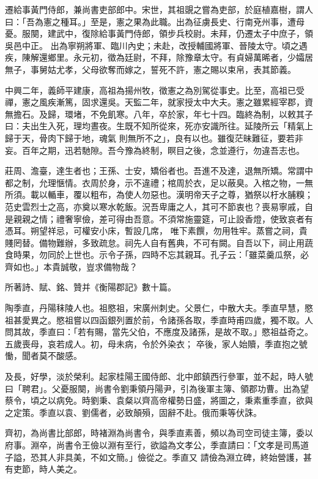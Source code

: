 \begin{pinyinscope}
 遷給事黃門侍郎，兼尚書吏部郎中。宋世，其祖覬之嘗為吏部，於庭植嘉樹，謂人曰：「吾為憲之種耳。」至是，憲之果為此職。出為征虜長史、行南兗州事，遭母憂。服闋，建武中，復除給事黃門侍郎，領步兵校尉。未拜，仍遷太子中庶子，領吳邑中正。
 出為寧朔將軍、臨川內史；未赴，改授輔國將軍、晉陵太守。頃之遇疾，陳解還鄉里。永元初，徵為廷尉，不拜，除豫章太守。有貞婦萬晞者，少孀居無子，事舅姑尤孝，父母欲奪而嫁之，誓死不許，憲之賜以束帛，表其節義。



 中興二年，義師平建康，高祖為揚州牧，徵憲之為別駕從事史。比至，高祖已受禪，憲之風疾漸篤，固求還吳。天監二年，就家授太中大夫。憲之雖累經宰郡，資無擔石。及歸，環堵，不免飢寒。八年，卒於家，年七十四。臨終為制，以敕其子曰：夫出生入死，理均晝夜。生既不知所從來，死亦安識所往。延陵所云「精氣上歸于天，骨肉下歸于地，魂氣
 則無所不之」，良有以也。雖復茫昧難征，要若非妄。百年之期，迅若馳隙。吾今豫為終制，瞑目之後，念並遵行，勿違吾志也。



 莊周、澹臺，達生者也；王孫、士安，矯俗者也。吾進不及達，退無所矯。常謂中都之制，允理愜情。衣周於身，示不違禮；棺周於衣，足以蔽臭。入棺之物，一無所須。載以輴車，覆以粗布，為使人勿惡也。漢明帝天子之尊，猶祭以杅水脯糗；范史雲烈士之高，亦奠以寒水乾飯。況吾卑庸之人，其可不節衷也？喪易寧戚，自是親親之情；禮奢寧儉，差可得由吾意。不須常施靈筵，可止設香燈，使致哀者有憑耳。朔望祥忌，可權安小床，暫設几席，
 唯下素饌，勿用牲牢。蒸嘗之祠，貴賤罔替。備物難辦，多致疏怠。祠先人自有舊典，不可有闕。自吾以下，祠止用蔬食時果，勿同於上世也。示令子孫，四時不忘其親耳。孔子云：「雖菜羹瓜祭，必齊如也。」本貴誠敬，豈求備物哉？



 所著詩、賦、銘、贊并《衡陽郡記》數十篇。



 陶季直，丹陽秣陵人也。祖愍祖，宋廣州刺史。父景仁，中散大夫。季直早慧，愍祖甚愛異之。愍祖嘗以四函銀列置於前，令諸孫各取，季直時甫四歲，獨不取。人問其故，季直曰：「若有賜，當先父伯，不應度及諸孫，是故不取。」愍祖益奇之。五歲喪母，哀若成人。初，母未病，令於外染衣；
 卒後，家人始贖，季直抱之號慟，聞者莫不酸感。



 及長，好學，淡於榮利。起家桂陽王國侍郎、北中郎鎮西行參軍，並不起，時人號曰「聘君」。父憂服闋，尚書令劉秉領丹陽尹，引為後軍主簿、領郡功曹。出為望蔡令，頃之以病免。時劉秉、袁粲以齊高帝權勢日盛，將圖之，秉素重季直，欲與之定策。季直以袁、劉儒者，必致顛殞，固辭不赴。俄而秉等伏誅。



 齊初，為尚書比部郎，時褚淵為尚書令，與季直素善，頻以為司空司徒主簿，委以府事。淵卒，尚書令王儉以淵有至行，欲謚為文孝公，季直請曰：「文孝是司馬道子謚，恐其人非具美，不如文簡。」儉從之。季直又
 請儉為淵立碑，終始營護，甚有吏節，時人美之。




\end{pinyinscope}
